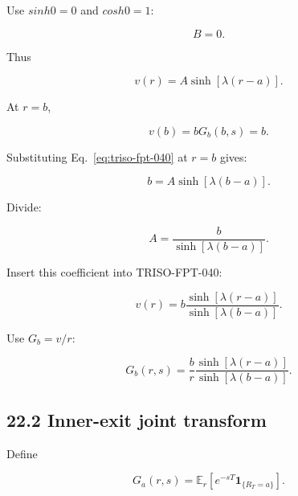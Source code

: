 \documentclass[11pt,a4paper]{article}
\begin{document}
Use $sinh0=0$ and $cosh0=1$:

\begin{equation}
B=0.
\tag{TRISO-FPT-039}
\label{eq:triso-fpt-039}
\end{equation}

Thus

\begin{equation}
v(r)=A\sinh[\lambda(r-a)].
\tag{TRISO-FPT-040}
\label{eq:triso-fpt-040}
\end{equation}

At $r=b$,

\begin{equation}
v(b)=bG_b(b,s)=b.
\tag{TRISO-FPT-041}
\label{eq:triso-fpt-041}
\end{equation}

Substituting Eq.~\eqref{eq:triso-fpt-040} at $r=b$ gives:

\begin{equation}
b=A\sinh[\lambda(b-a)].
\tag{TRISO-FPT-042}
\label{eq:triso-fpt-042}
\end{equation}

Divide:

\begin{equation}
A
=
\frac{b}{\sinh[\lambda(b-a)]}.
\tag{TRISO-FPT-043}
\label{eq:triso-fpt-043}
\end{equation}

Insert this coefficient into TRISO-FPT-040:

\begin{equation}
v(r)
=
b
\frac{\sinh[\lambda(r-a)]}
{\sinh[\lambda(b-a)]}.
\tag{TRISO-FPT-044}
\label{eq:triso-fpt-044}
\end{equation}

Use $G_b=v/r$:

\begin{equation}
\boxed{
G_b(r,s)
=
\frac{b}{r}
\frac{\sinh[\lambda(r-a)]}
{\sinh[\lambda(b-a)]}.
}
\tag{TRISO-FPT-045}
\label{eq:triso-fpt-045}
\end{equation}

\subsection*{22.2 Inner-exit joint transform}

Define

\begin{equation}
G_a(r,s)
=
\mathbb E_r\left[e^{-sT}\mathbf 1_{\{R_T=a\}}\right].
\tag{TRISO-FPT-046}
\label{eq:triso-fpt-046}
\end{equation}
\end{document}
